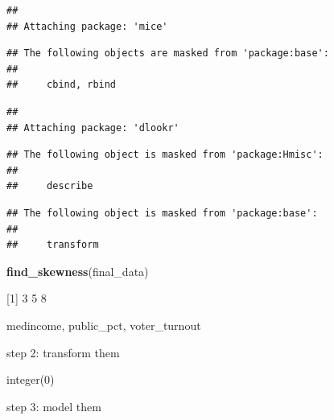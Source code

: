 \documentclass[
]{article}
\newenvironment{Shaded}{\begin{snugshade}}{\end{snugshade}}
\newcommand{\DataTypeTok}[1]{\textcolor[rgb]{0.13,0.29,0.53}{#1}}
\newcommand{\FloatTok}[1]{\textcolor[rgb]{0.00,0.00,0.81}{#1}}
\newcommand{\KeywordTok}[1]{\textcolor[rgb]{0.13,0.29,0.53}{\textbf{#1}}}
\newcommand{\NormalTok}[1]{#1}
\newcommand{\OperatorTok}[1]{\textcolor[rgb]{0.81,0.36,0.00}{\textbf{#1}}}
\newcommand{\StringTok}[1]{\textcolor[rgb]{0.31,0.60,0.02}{#1}}
\begin{document}
\begin{verbatim}
## 
## Attaching package: 'mice'
\end{verbatim}

\begin{verbatim}
## The following objects are masked from 'package:base':
## 
##     cbind, rbind
\end{verbatim}

\begin{verbatim}
## 
## Attaching package: 'dlookr'
\end{verbatim}

\begin{verbatim}
## The following object is masked from 'package:Hmisc':
## 
##     describe
\end{verbatim}

\begin{verbatim}
## The following object is masked from 'package:base':
## 
##     transform
\end{verbatim}

\begin{Shaded}
\begin{Highlighting}[]
\KeywordTok{find_skewness}\NormalTok{(final_data)}
\end{Highlighting}
\end{Shaded}

{[}1{]} 3 5 8

medincome, public\_pct, voter\_turnout

step 2: transform them

\begin{Shaded}
\end{Shaded}

integer(0)

step 3: model them
\end{document}
